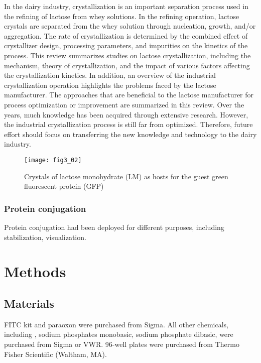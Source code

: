 \begin{refsection}
In the dairy industry, crystallization is an important separation
process used in the refining of lactose from whey solutions. In the refining
operation, lactose crystals are separated from the whey solution through
nucleation, growth, and/or aggregation. The rate of crystallization is
determined by the combined effect of crystallizer design, processing
parameters, and impurities on the kinetics of the process. This review
summarizes studies on lactose crystallization, including the mechanism, theory
of crystallization, and the impact of various factors affecting the
crystallization kinetics. In addition, an overview of the industrial
crystallization operation highlights the problems faced by the lactose
manufacturer. The approaches that are beneficial to the lactose manufacturer
for process optimization or improvement are summarized in this review. Over the
years, much knowledge has been acquired through extensive research. However,
the industrial crystallization process is still far from optimized. Therefore,
future effort should focus on transferring the new knowledge and technology to
the dairy industry.

\begin{figure}[h!] \centering \texttt{[image: fig3\_02]} 
    \caption[Crystals of lactose monohydrate (LM) as hosts for the guest green
    fluorescent protein (GFP)]{Crystals of lactose monohydrate (LM) as hosts
    for the guest green fluorescent protein (GFP)}
    \label{fig:lm-intro}
\end{figure}

\subsubsection{Protein conjugation}

Protein conjugation had been deployed for different purposes, including
stabilization, visualization. 

\section{Methods}

\subsection{Materials}

FITC kit and paraoxon were purchased from Sigma. All other chemicals,
including , sodium phosphates monobasic, sodium phosphate dibasic,
were purchased from Sigma or VWR. 96-well plates were purchased from Thermo
Fisher Scientific (Waltham, MA).


\end{refsection}
